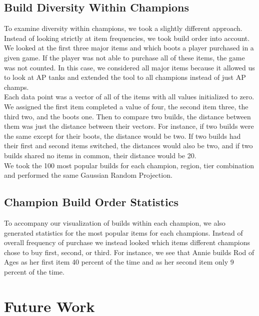 \documentclass[11pt]{amsart}
\begin{document}
\subsection{Build Diversity Within Champions}

To examine diversity within champions, we took a slightly different approach. Instead of looking strictly at item frequencies, we took build order into account. We looked at the first three major items and which boots a player purchased in a given game. If the player was not able to purchase all of these items, the game was not counted. In this case, we considered all major items because it allowed us to look at AP tanks and extended the tool to all champions instead of just AP champs.\\

Each data point was a vector of all of the items with all values initialized to zero. We assigned the first item completed a value of four, the second item three, the third two, and the boots one. Then to compare two builds, the distance between them was just the distance between their vectors. For instance, if two builds were the same except for their boots, the distance would be two. If two builds had their first and second items switched, the distances would also be two, and if two builds shared no items in common, their distance would be 20.\\

We took the 100 most popular builds for each champion, region, tier combination and performed the same Gaussian Random Projection.\\


\subsection{Champion Build Order Statistics}

To accompany our visualization of builds within each champion, we also generated statistics for the most popular items for each champions. Instead of overall frequency of purchase we instead looked which items different champions chose to buy first, second, or third. For instance, we see that Annie builds Rod of Ages as her first item 40 percent of the time and as her second item only 9 percent of the time.\\

\section{Future Work}
\end{document}
